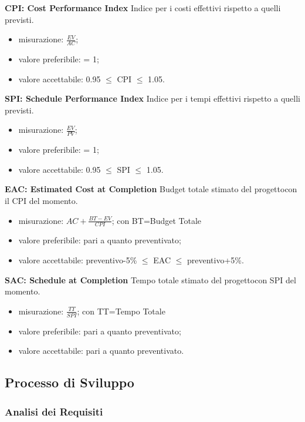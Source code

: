 				\textbf{CPI: Cost Performance Index} Indice per i costi effettivi rispetto a quelli previsti.
				\begin{itemize}
					\item misurazione: $\frac{EV}{AC}$;
					\item valore preferibile: = 1;
					\item valore accettabile: 0.95 $\le$ CPI $\le$ 1.05.
				\end{itemize}
				\textbf{SPI: Schedule Performance Index} Indice per i tempi effettivi rispetto a quelli previsti.
				\begin{itemize}
					\item misurazione: $\frac{EV}{PV}$;
					\item valore preferibile: = 1;
					\item valore accettabile: 0.95 $\le$ SPI $\le$ 1.05.
				\end{itemize}
				\textbf{EAC: Estimated Cost at Completion} Budget totale stimato del progetto\glosp con il CPI del momento.
				\begin{itemize}
					\item misurazione: $AC+ \frac{BT-EV}{CPI}$; con BT=Budget Totale
					\item valore preferibile: pari a quanto preventivato;
					\item valore accettabile: preventivo-5\% $\le$ EAC $\le$ preventivo+5\%.
				\end{itemize}
				\textbf{SAC: Schedule at Completion} Tempo totale stimato del progetto\glosp con SPI del momento.
				\begin{itemize}
					\item misurazione: $\frac{TT}{SPI}$; con TT=Tempo Totale
					\item valore preferibile: pari a quanto preventivato;
					\item valore accettabile: pari a quanto preventivato.
				\end{itemize}
				
											
	\subsection{Processo di Sviluppo}
		\subsubsection{Analisi dei Requisiti} 
